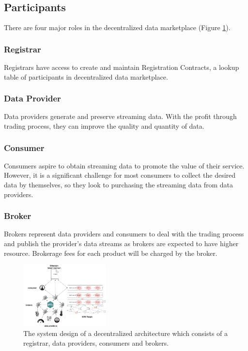 \documentclass[journal,10pt,a4paper]{IEEEtran}
\begin{document}
\subsection{Participants}
There are four major roles in the decentralized data marketplace (Figure \ref{fig:system_design}).

\subsubsection{Registrar}
Registrars have access to create and maintain Registration Contracts, a lookup table of participants in decentralized data marketplace. 

\subsubsection{Data Provider}
Data providers generate and preserve streaming data. With the profit through trading process, they can improve the quality and quantity of data.

\subsubsection{Consumer}
Consumers aspire to obtain streaming data to promote the value of their service. However, it is a significant challenge for most consumers to collect the desired data by themselves, so they look to purchasing the streaming data from data providers.

\subsubsection{Broker}
Brokers represent data providers and consumers to deal with the trading process and publish the provider's data streams as brokers are expected to have higher resource. Brokerage fees for each product will be charged by the broker.

\begin{figure}[h]
    \centering
    \includegraphics[width=0.4\textwidth]{system_design}
    \caption{The system design of a decentralized architecture which consists of a registrar, data providers, consumers and brokers.}
    \label{fig:system_design}
\end{figure}
\end{document}
